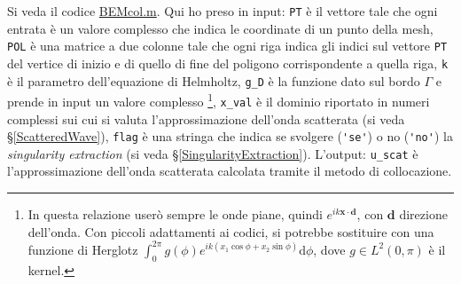 Si veda il codice \href{https://github.com/Daldossi/BEM/blob/main/BEM_col.m}{BEMcol.m}.
Qui ho preso in input: \verb|PT| è il vettore tale che ogni entrata è un valore complesso che indica le coordinate di un punto della mesh, \verb|POL| è una matrice a due colonne tale che ogni riga indica gli indici sul vettore \verb|PT| del vertice di inizio e di quello di fine del poligono corrispondente a quella riga, \verb|k| è il parametro dell'equazione di Helmholtz, \verb|g_D| è la funzione dato sul bordo $\Gamma$ e prende in input un valore complesso \footnote{In questa relazione userò sempre le onde piane, quindi $e^{ik\textbf{x}\cdot\textbf{d}}$, con $\textbf{d}$ direzione dell'onda. Con piccoli adattamenti ai codici, si potrebbe sostituire con una funzione di Herglotz $\int_0^{2\pi}g(\phi)e^{ik(x_1\cos\phi+x_2\sin\phi)}\mathrm{d}\phi$, dove $g\in L^2(0,\pi)$ è il kernel.}, \verb|x_val| è il dominio riportato in numeri complessi sui cui si valuta l'approssimazione dell'onda scatterata (si veda \S \ref{ScatteredWave}), \verb|flag| è una stringa che indica se svolgere (\verb|'se'|) o no (\verb|'no'|) la \textit{singularity extraction} (si veda \S \ref{SingularityExtraction}). L'output: \verb|u_scat| è l'approssimazione dell'onda scatterata calcolata tramite il metodo di collocazione.



